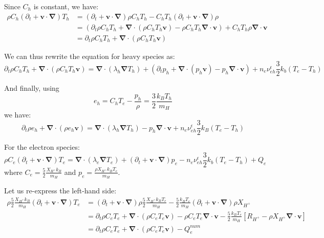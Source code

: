 \documentclass[11pt, oneside]{article}   	%
\begin{document}
Since $C_h$ is constant, we have:
\begin{align*}
\rho C_h (\partial_t + \boldsymbol{v}\cdot\boldsymbol{\nabla})T_h &=  (\partial_t + \boldsymbol{v}\cdot\boldsymbol{\nabla}) \rho C_h T_h - C_h T_h  (\partial_t + \boldsymbol{v}\cdot\boldsymbol{\nabla})\rho \\
&= (\partial_t \rho C_h T_h + \boldsymbol{\nabla}\cdot(\rho C_h T_h \boldsymbol{v}) - \rho C_h T_h \boldsymbol{\nabla}\cdot\boldsymbol{v} ) + C_hT_h \rho \boldsymbol{\nabla}\cdot\boldsymbol{v} \\
& =  \partial_t \rho C_h T_h + \boldsymbol{\nabla}\cdot(\rho C_h T_h \boldsymbol{v})
\end{align*}

We can thus rewrite the equation for heavy species as:
\[ \partial_t \rho C_h T_h + \boldsymbol{\nabla}\cdot(\rho C_h T_h \boldsymbol{v}) = \boldsymbol{\nabla}\cdot(\lambda_h\boldsymbol{\nabla}T_h) + (\partial_t p_h + \boldsymbol{\nabla}\cdot(p_h \boldsymbol{v}) - p_h \boldsymbol{\nabla}\cdot \boldsymbol{v}) + n_e\nu_{eh}^\epsilon \frac{3}{2}k_b(T_e - T_h) \]

And finally, using
\[ e_h = C_h T_e - \frac{p_h}{\rho} = \frac{3}{2}\frac{k_B T_h}{m_H} \]
we have:
\[ \partial_t \rho e_h + \boldsymbol{\nabla}\cdot(\rho e_h \boldsymbol{v}) = \boldsymbol{\nabla}\cdot(\lambda_h\boldsymbol{\nabla}T_h) - p_h \boldsymbol{\nabla}\cdot \boldsymbol{v} + n_e\nu_{eh}^\epsilon \frac{3}{2}k_B(T_e - T_h) \]


For the electron species:
\[ \rho C_e (\partial_t + \boldsymbol{v}\cdot\boldsymbol{\nabla})T_e = \boldsymbol{\nabla}\cdot(\lambda_e\boldsymbol{\nabla}T_e) + (\partial_t + \boldsymbol{v}\cdot\boldsymbol{\nabla})p_e - n_e\nu_{eh}^\epsilon \frac{3}{2}k_b(T_e - T_h) + Q_e\]
where $C_e = \frac{5}{2}\frac{X_{H^+}k_B}{m_H}$ and $p_e = \frac{\rho X_{H^+} k_B T_e}{m_H}$.

Let us re-express the left-hand side:
\begin{align*}
\rho \frac{5}{2}\frac{X_{H^+}k_B}{m_H} (\partial_t + \boldsymbol{v}\cdot\boldsymbol{\nabla})T_e  &=  (\partial_t + \boldsymbol{v}\cdot\boldsymbol{\nabla}) \rho \frac{5}{2}\frac{X_{H^+}k_B T_e}{m_H} - \frac{5}{2}\frac{k_BT_e}{m_H} (\partial_t + \boldsymbol{v}\cdot\boldsymbol{\nabla}) \rho X_{H^+} \\
&= \partial_t \rho C_e T_e + \boldsymbol{\nabla}\cdot( \rho C_e T_e \boldsymbol{v} ) - \rho C_e T_e\boldsymbol{\nabla}\cdot \boldsymbol{v}  - \frac{5}{2}\frac{k_BT_e}{m_H} \left[ R_{H^+} - \rho X_{H^+}\boldsymbol{\nabla}\cdot\boldsymbol{v}\right] \\
& = \partial_t \rho C_e T_e + \boldsymbol{\nabla}\cdot( \rho C_e T_e \boldsymbol{v} ) - Q_e^{num}
\end{align*}
\end{document}
